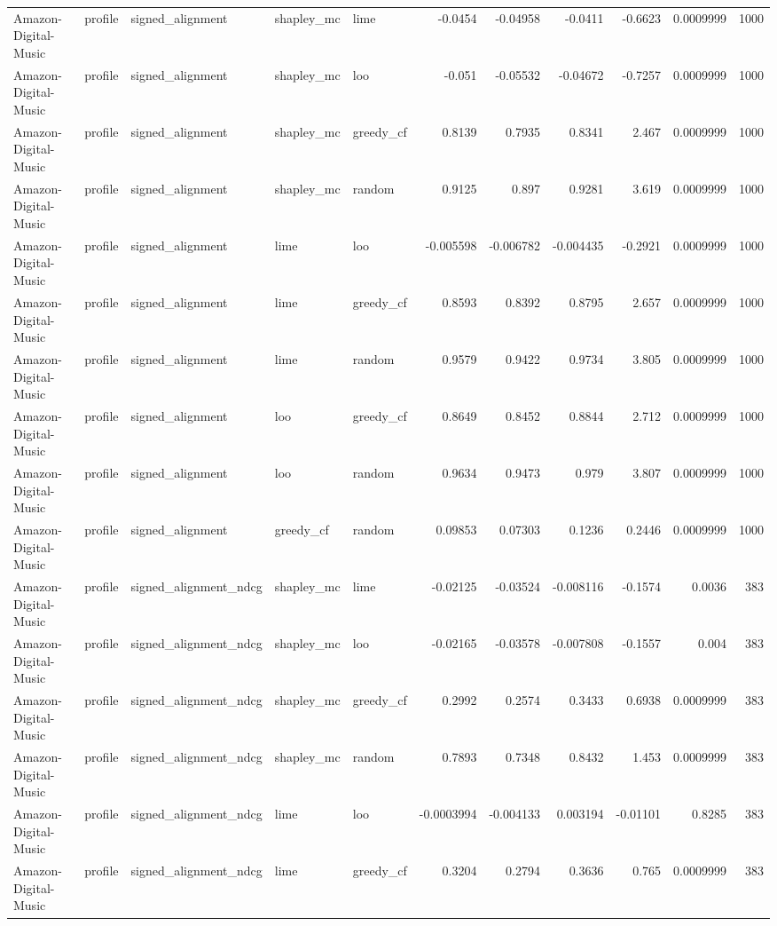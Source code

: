 \begin{table}[t]
\begin{tabular}{lllllrrrrrr}
Amazon-Digital-Music & profile & signed\_alignment & shapley\_mc & lime & -0.0454 & -0.04958 & -0.0411 & -0.6623 & 0.0009999 & 1000 \\
Amazon-Digital-Music & profile & signed\_alignment & shapley\_mc & loo & -0.051 & -0.05532 & -0.04672 & -0.7257 & 0.0009999 & 1000 \\
Amazon-Digital-Music & profile & signed\_alignment & shapley\_mc & greedy\_cf & 0.8139 & 0.7935 & 0.8341 & 2.467 & 0.0009999 & 1000 \\
Amazon-Digital-Music & profile & signed\_alignment & shapley\_mc & random & 0.9125 & 0.897 & 0.9281 & 3.619 & 0.0009999 & 1000 \\
Amazon-Digital-Music & profile & signed\_alignment & lime & loo & -0.005598 & -0.006782 & -0.004435 & -0.2921 & 0.0009999 & 1000 \\
Amazon-Digital-Music & profile & signed\_alignment & lime & greedy\_cf & 0.8593 & 0.8392 & 0.8795 & 2.657 & 0.0009999 & 1000 \\
Amazon-Digital-Music & profile & signed\_alignment & lime & random & 0.9579 & 0.9422 & 0.9734 & 3.805 & 0.0009999 & 1000 \\
Amazon-Digital-Music & profile & signed\_alignment & loo & greedy\_cf & 0.8649 & 0.8452 & 0.8844 & 2.712 & 0.0009999 & 1000 \\
Amazon-Digital-Music & profile & signed\_alignment & loo & random & 0.9634 & 0.9473 & 0.979 & 3.807 & 0.0009999 & 1000 \\
Amazon-Digital-Music & profile & signed\_alignment & greedy\_cf & random & 0.09853 & 0.07303 & 0.1236 & 0.2446 & 0.0009999 & 1000 \\
Amazon-Digital-Music & profile & signed\_alignment\_ndcg & shapley\_mc & lime & -0.02125 & -0.03524 & -0.008116 & -0.1574 & 0.0036 & 383 \\
Amazon-Digital-Music & profile & signed\_alignment\_ndcg & shapley\_mc & loo & -0.02165 & -0.03578 & -0.007808 & -0.1557 & 0.004 & 383 \\
Amazon-Digital-Music & profile & signed\_alignment\_ndcg & shapley\_mc & greedy\_cf & 0.2992 & 0.2574 & 0.3433 & 0.6938 & 0.0009999 & 383 \\
Amazon-Digital-Music & profile & signed\_alignment\_ndcg & shapley\_mc & random & 0.7893 & 0.7348 & 0.8432 & 1.453 & 0.0009999 & 383 \\
Amazon-Digital-Music & profile & signed\_alignment\_ndcg & lime & loo & -0.0003994 & -0.004133 & 0.003194 & -0.01101 & 0.8285 & 383 \\
Amazon-Digital-Music & profile & signed\_alignment\_ndcg & lime & greedy\_cf & 0.3204 & 0.2794 & 0.3636 & 0.765 & 0.0009999 & 383 \\

\end{tabular}
\end{table}

